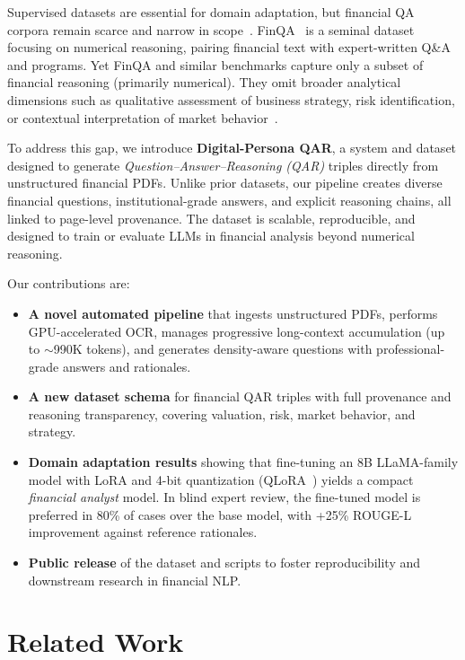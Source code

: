\documentclass[sigconf,authordraft,anonymous]{acmart}
\begin{document}
Supervised datasets are essential for domain adaptation, but financial QA corpora remain scarce and narrow in scope~\cite{Chen2023FinTextQA}. FinQA~\cite{chen2022finqadatasetnumericalreasoning} is a seminal dataset focusing on numerical reasoning, pairing financial text with expert-written Q\&A and programs. Yet FinQA and similar benchmarks capture only a subset of financial reasoning (primarily numerical). They omit broader analytical dimensions such as qualitative assessment of business strategy, risk identification, or contextual interpretation of market behavior~\cite{Mateega2025}.

To address this gap, we introduce \textbf{Digital-Persona QAR}, a system and dataset designed to generate \emph{Question--Answer--Reasoning (QAR)} triples directly from unstructured financial PDFs. Unlike prior datasets, our pipeline creates diverse financial questions, institutional-grade answers, and explicit reasoning chains, all linked to page-level provenance. The dataset is scalable, reproducible, and designed to train or evaluate LLMs in financial analysis beyond numerical reasoning.

Our contributions are:
\begin{itemize}
  \item \textbf{A novel automated pipeline} that ingests unstructured PDFs, performs GPU-accelerated OCR, manages progressive long-context accumulation (up to $\sim$990K tokens), and generates density-aware questions with professional-grade answers and rationales.
  \item \textbf{A new dataset schema} for financial QAR triples with full provenance and reasoning transparency, covering valuation, risk, market behavior, and strategy.
  \item \textbf{Domain adaptation results} showing that fine-tuning an 8B LLaMA-family model with LoRA and 4-bit quantization (QLoRA~\cite{dettmers2023qloraefficientfinetuningquantized}) yields a compact \emph{financial analyst} model. In blind expert review, the fine-tuned model is preferred in 80\% of cases over the base model, with +25\% ROUGE-L improvement against reference rationales.
  \item \textbf{Public release} of the dataset and scripts to foster reproducibility and downstream research in financial NLP.
\end{itemize}

\section{Related Work}
\end{document}
